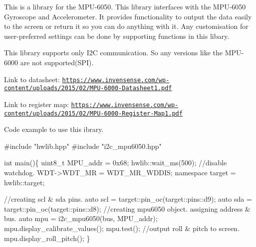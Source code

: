 This is a library for the M\+P\+U-\/6050. This library interfaces with the M\+P\+U-\/6050 Gyroscope and Accelerometer. It provides functionality to output the data easily to the screen or return it so you can do anything with it. Any customisation for user-\/preferred settings can be done by supporting functions in this libary.

This library supports only I2C communication. So any versions like the M\+P\+U-\/6000 are not supported(\+S\+P\+I).



Link to datasheet\+: \href{https://www.invensense.com/wp-content/uploads/2015/02/MPU-6000-Datasheet1.pdf}{\tt https\+://www.\+invensense.\+com/wp-\/content/uploads/2015/02/\+M\+P\+U-\/6000-\/\+Datasheet1.\+pdf}

Link to register map\+: \href{https://www.invensense.com/wp-content/uploads/2015/02/MPU-6000-Register-Map1.pdf}{\tt https\+://www.\+invensense.\+com/wp-\/content/uploads/2015/02/\+M\+P\+U-\/6000-\/\+Register-\/\+Map1.\+pdf}

Code example to use this ibrary.


\begin{DoxyCode}
#include "hwlib.hpp"
#include "i2c\_mpu6050.hpp"

int main()\{
      uint8\_t MPU\_addr = 0x68;
      hwlib::wait\_ms(500);
      //disable watchdog.
      WDT->WDT\_MR = WDT\_MR\_WDDIS;
      namespace target = hwlib::target;

      //creating scl & sda pins.
      auto scl = target::pin\_oc(target::pins::d9);
      auto sda = target::pin\_oc(target::pins::d8);
      //creating mpu6050 object. assigning address & bus.
      auto mpu = i2c\_mpu6050(bus, MPU\_addr);
      mpu.display\_calibrate\_values();
      mpu.test();
      //output roll & pitch to screen.
      mpu.display\_roll\_pitch();
\}
\end{DoxyCode}
 